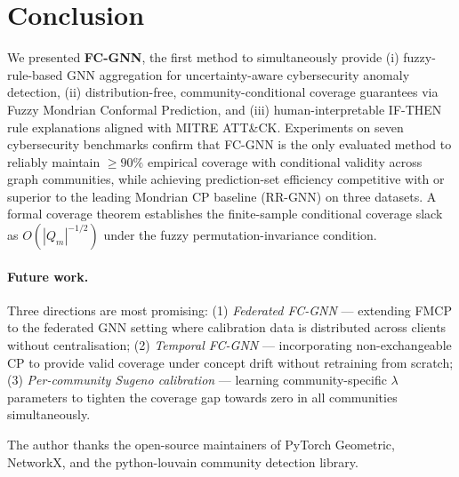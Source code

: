 \section{Conclusion}
\label{sec:conclusion}

We presented \textbf{FC-GNN}, the first method to simultaneously provide
(i) fuzzy-rule-based GNN aggregation for uncertainty-aware cybersecurity
anomaly detection, (ii) distribution-free, community-conditional coverage
guarantees via Fuzzy Mondrian Conformal Prediction, and (iii) human-interpretable
IF-THEN rule explanations aligned with MITRE ATT\&CK.
Experiments on seven cybersecurity benchmarks confirm that FC-GNN is the
only evaluated method to reliably maintain $\ge\!90\%$ empirical coverage
with conditional validity across graph communities, while achieving prediction-set
efficiency competitive with or superior to the leading Mondrian CP baseline
(RR-GNN) on three datasets.
A formal coverage theorem establishes the finite-sample conditional
coverage slack as $O(|Q_m|^{-1/2})$ under the fuzzy permutation-invariance
condition.

\paragraph{Future work.}
Three directions are most promising:
(1) \emph{Federated FC-GNN} — extending FMCP to the federated GNN setting
\citep{akgul25,dang24federated} where calibration data is distributed
across clients without centralisation;
(2) \emph{Temporal FC-GNN} — incorporating non-exchangeable CP
\citep{ncpnet25} to provide valid coverage under concept drift without
retraining from scratch;
(3) \emph{Per-community Sugeno calibration} — learning community-specific
$\lambda$ parameters to tighten the coverage gap towards zero in all
communities simultaneously.

\begin{acknowledgements}
The author thanks the open-source maintainers of PyTorch Geometric, NetworkX,
and the python-louvain community detection library.
\end{acknowledgements}
